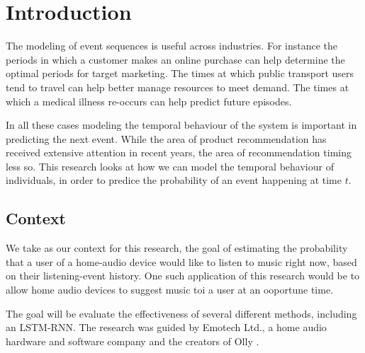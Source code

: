 
\chapter{Introduction} %

\label{Chapter1} %


\newcommand{\keyword}[1]{\textbf{#1}}
\newcommand{\tabhead}[1]{\textbf{#1}}
\newcommand{\code}[1]{\texttt{#1}}
\newcommand{\file}[1]{\texttt{\bfseries#1}}
\newcommand{\option}[1]{\texttt{\itshape#1}}

The modeling of event sequences is useful across industries. For instance the periods in which a customer makes an online purchase can help determine the optimal periods for target marketing. The times at which public transport users tend to travel can help better manage resources to meet demand. The times at which a medical illness re-occurs can help predict future episodes.
 
In all these cases modeling the temporal behaviour of the system is important in predicting the next event. While the area of product recommendation has received extensive attention in recent years, the area of recommendation timing less so. This research looks at how we can model the temporal behaviour of individuals, in order to predice the probability of an event happening at time $t$.

\section{Context}

We take as our context for this research, the goal of estimating the probability that a user of a home-audio device would like to listen to music right now, based on their listening-event history. One such application of this research would be to allow home audio devices to suggest music toi a user at an ooportune time.

The goal will be evaluate the effectiveness of several different methods, including an LSTM-RNN. 
The research was guided by Emotech Ltd., a home audio hardware and software company and the creators of Olly \parencite{Olly}.

